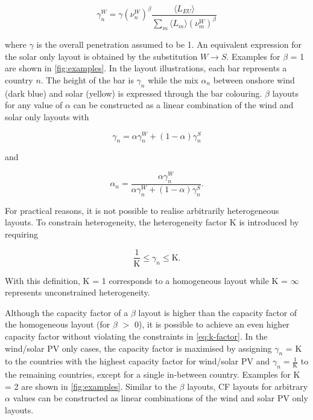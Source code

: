\documentclass[a4paper, 5p, sort&compress]{elsarticle}%
\newcommand{\paren}[1]{\left(#1\right)}
\begin{document}
\begin{equation}
  \label{eq:8}
  \gamma_{n}^{W} = \gamma \paren{\nu^{W}_{n}}^{\beta} \frac{\langle L_{EU}
    \rangle}{\sum_{m} \langle L_{m}
    \rangle \paren{\nu^{W}_{m}}^{\beta}}
\end{equation}

where $\gamma$ is the overall penetration assumed to be 1. An equivalent
expression for the solar only layout is obtained by the substitution
$W \to S$. Examples for $\beta$ = 1 are shown in \cref{fig:examples}. In
the layout illustrations, each bar represents a country $n$. The
height of the bar is $\gamma_{n}$ while the mix $\alpha_{n}$ between onshore
wind (dark blue) and solar (yellow) is expressed through the bar
colouring. $\beta$ layouts for any value of $\alpha$ can be constructed as a
linear combination of the wind and solar only layouts with


\begin{equation}
  \label{eq:9}
  \gamma_{n} = \alpha \gamma^{W}_{n} + (1-\alpha) \gamma^{S}_{n} 
\end{equation}

and

\begin{equation}
  \label{eq:9}
  \alpha_{n} = \frac{\alpha \gamma_{n}^{W}}{\alpha \gamma_{n}^{W} + (1-\alpha) \gamma_{n}^{S}} .
\end{equation}


For practical reasons, it is not possible to realise arbitrarily
heterogeneous layouts. To constrain heterogeneity, the heterogeneity
factor K is introduced by requiring

\begin{equation}
  \label{eq:k-factor}
  \frac{1}{\text{K}} \leq \gamma_{n} \leq \text{K} .
\end{equation}

With this definition, K = 1 corresponds to a homogeneous layout while
K = $\infty$ represents unconstrained heterogeneity.

Although the capacity factor of a $\beta$ layout is higher than the
capacity factor of the homogeneous layout (for $\beta$ $>$ 0), it is
possible to achieve an even higher capacity factor without violating
the constraints in \cref{eq:k-factor}. In the wind/solar PV only
cases, the capacity factor is maximised by assigning $\gamma_{n}$ = K to
the countries with the highest capacity factor for wind/solar PV and
$\gamma_{n} = \frac{1}{\text{K}}$ to the remaining countries, except for a
single in-between country. Examples for K = 2 are shown in
\cref{fig:examples}. Similar to the $\beta$ layouts, CF layouts for
arbitrary $\alpha$ values can be constructed as linear combinations of the
wind and solar PV only layouts.
\end{document}
